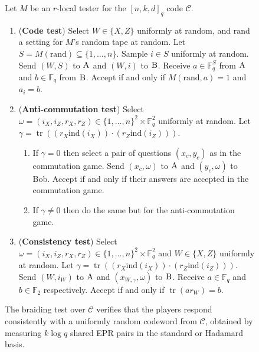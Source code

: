 \documentclass[11pt]{article}
\theoremstyle{definition}
\newcommand{\code}{\mathcal{C}}
\newcommand{\F}{\ensuremath{\mathbb{F}}}
\newcommand{\ind}{\ensuremath{\mathrm{ind}}}
\newcommand{\rand}{\textrm{rand}}
\DeclareMathOperator{\tr}{tr}
\newcommand{\labelstyle}[1]{\ensuremath{\textsc{#1}}\xspace}
\newcommand{\alice}{\labelstyle{A}}
\newcommand{\bob}{\labelstyle{B}}
\newenvironment{gamespec}{
  \begin{mdframed}[style=figstyle]}{
  \end{mdframed}}
\begin{document}
\begin{figure}[!htbp]
  \centering
  \begin{gamespec}
Let $M$ be an $r$-local tester for the $[n,k,d]_q$ code $\code$. 
    \begin{enumerate}
      \setlength\itemsep{1pt}
    \item (\textbf{Code test}) Select $W\in \{X,Z\}$ uniformly at random, and $\rand$ a setting for $M$'s random tape at random. Let $S=M(\rand)\subseteq\{1,\ldots,n\}$. Sample $i\in S$ uniformly at random. Send $(W,S)$ to $\alice$ and $(W,i)$ to $\bob$. Receive $a\in \F_q^S$ from $\alice$ and $b\in \F_q$ from $\bob$. Accept if and only if $M(\rand,a)=1$ and $a_i = b$.  
    \item (\textbf{Anti-commutation test}) Select $\omega=(i_X,i_Z,r_X,r_Z)\in \{1,\ldots,n\}^2 \times \F_q^2$ uniformly at random. Let $\gamma = \tr( (r_X\ind(i_X))\cdot  (r_Z \ind(i_Z)))$.
		\begin{enumerate}
		\item If $\gamma=0$ then select a pair of questions $(x_c,y_c)$ as in the commutation game. Send $(x_c,\omega)$ to $\alice$ and $(y_c,\omega)$ to Bob. Accept if and only if their answers are accepted in the commutation game. 
		\item If $\gamma\neq 0$ then do the same but for the anti-commutation game. 
		\end{enumerate} 
		 \item (\textbf{Consistency test}) Select $\omega=(i_X,i_Z,r_X,r_Z)\in \{1,\ldots,n\}^2 \times \F_q^2$ and $W\in \{X,Z\}$ uniformly at random. Let $\gamma = \tr( (r_X\ind(i_X))\cdot  (r_Z \ind(i_Z)))$. Send $(W,i_W)$ to $\alice$ and $(x_{W,\gamma},\omega)$ to $\bob$. Receive $a\in \F_q$ and $b\in \F_2$ respectively. Accept if and only if $\tr(a r_W)=b$. 
    \end{enumerate}
  \end{gamespec}
  \caption{The braiding test over $\code$ verifies that the players respond consistently with a uniformly random codeword from $\code$, obtained by measuring $k\log q$ shared EPR pairs in the standard or Hadamard basis.}
  \label{fig:braiding-test}
\end{figure}
\end{document}

